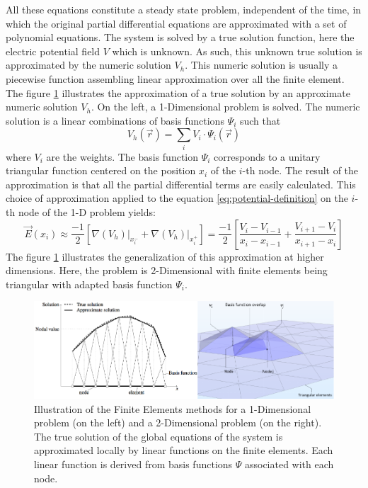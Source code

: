 All these equations constitute a steady state problem, independent of the time, in which the original partial differential equations are approximated with a set of polynomial equations. The system is solved by a true solution function, here the electric potential field $V$ which is unknown. As such, this unknown true solution is approximated by the numeric solution $V_h$. This numeric solution is usually a piecewise function assembling linear approximation over all the finite element. 
The figure \ref{fig:fem-illustration} illustrates the approximation of a true solution by an approximate numeric solution $V_h$. On the left, a 1-Dimensional problem is solved. The numeric solution is a linear combinations of basis functions $\Psi_i$ such that
\begin{equation}
V_h (\vec{r}) = \sum_i V_i \cdot \Psi_i (\vec{r})
\end{equation}
where $V_i$ are the weights. The basis function $\Psi_i$ corresponds to a unitary triangular function centered on the position $x_i$ of the $i$-th node.
The result of the approximation is that all the partial differential terms are easily calculated. This choice of approximation applied to the equation \ref{eq:potential-definition} on the $i$-th node of the 1-D problem yields:
\begin{equation}
\vec{E} (x_i)
\approx
\frac{-1}{2}
\left[
\left. \nabla \left( V_h \right) \right\vert_{x_i^-}
+
\left. \nabla \left( V_h \right) \right\vert_{x_i^+}
\right]
=
\frac{-1}{2}
\left[
\frac{V_i - V_{i-1}}{x_i - x_{i-1}}
+
\frac{V_{i+1} - V_i}{x_{i+1} - x_i}
\right]
\end{equation}
The figure \ref{fig:fem-illustration} illustrates the generalization of this approximation at higher dimensions. Here, the problem is 2-Dimensional with finite elements being triangular with adapted basis function $\Psi_i$.

\begin{figure}
\centering
\includegraphics[scale=1]{Figures/Electrodes/fem_illustration.pdf}
\caption{Illustration of the Finite Elements methods for a 1-Dimensional problem (on the left) and a 2-Dimensional problem (on the right). The true solution of the global equations of the system is approximated locally by linear functions on the finite elements. Each linear function is derived from basis functions $\Psi$ associated with each node.}
\label{fig:fem-illustration}
\end{figure}

